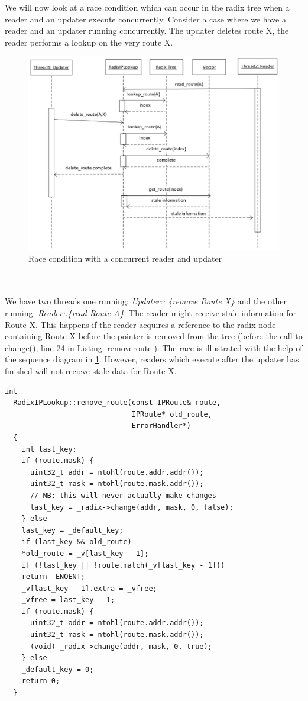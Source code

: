\documentclass[12pt,a4paper]{article}
\begin{document}
We will now look at a race condition which can occur in the radix tree when a reader and an updater execute concurrently. Consider a case where we have a reader and an updater running concurrently. The updater deletes route X, the reader performs a lookup on the very route X.
\begin{figure}[tph]
\begin{center}
\includegraphics[scale=0.6]{../images/diagrams/race1eps.eps}
\end{center}
\caption{Race condition with a concurrent reader and updater}
\label{race1figure}
\end{figure}
\\\\
We have two threads one running: \emph{Updater:: \{remove Route X\}} and the other running: \emph{Reader::\{read Route A\}}. The reader might receive stale information for Route X. This happens if the reader acquires a reference to the radix node containing Route X before the pointer is removed from the tree (before the call to change(), line 24 in Listing \ref{removeroute}). The race is illustrated with the help of the sequence diagram in \ref{race1figure}. However, readers which execute after the updater has finished will not recieve stale data for Route X.
\begin{lstlisting}[caption= The remove\_route() function, label=removeroute,float=tph]
  int
  RadixIPLookup::remove_route(const IPRoute& route, 
                              IPRoute* old_route, 
                              ErrorHandler*)
  {
    int last_key;
    if (route.mask) {
      uint32_t addr = ntohl(route.addr.addr());
      uint32_t mask = ntohl(route.mask.addr());
      // NB: this will never actually make changes
      last_key = _radix->change(addr, mask, 0, false);
    } else
    last_key = _default_key;
    if (last_key && old_route)
    *old_route = _v[last_key - 1];
    if (!last_key || !route.match(_v[last_key - 1]))
    return -ENOENT;
    _v[last_key - 1].extra = _vfree;
    _vfree = last_key - 1;
    if (route.mask) {
      uint32_t addr = ntohl(route.addr.addr());
      uint32_t mask = ntohl(route.mask.addr());
      (void) _radix->change(addr, mask, 0, true);
    } else
    _default_key = 0;
    return 0;
  }
\end{lstlisting}
\end{document}
